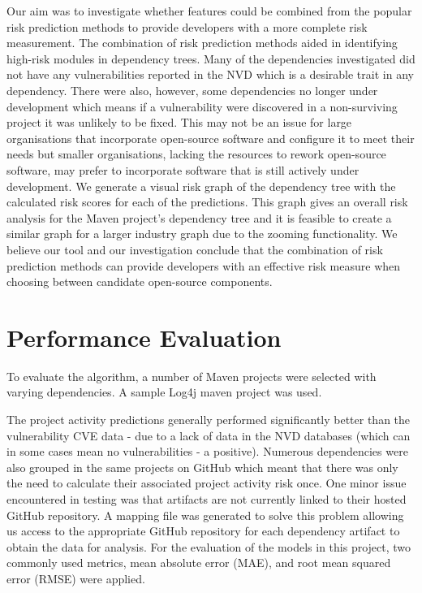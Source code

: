 \documentclass[conference]{IEEEtran}
\begin{document}
Our aim was to investigate whether features could be combined from the popular risk prediction methods to provide developers with a more complete risk measurement. The combination of risk prediction methods aided in identifying high-risk modules in dependency trees. Many of the dependencies investigated did not have any vulnerabilities reported in the NVD which is a desirable trait in any dependency. There were also, however, some dependencies no longer under development which means if a vulnerability were discovered in a non-surviving project it was unlikely to be fixed. This may not be an issue for large organisations that incorporate open-source software and configure it to meet their needs but smaller organisations, lacking the resources to rework open-source software, may prefer to incorporate software that is still actively under development. We generate a visual risk graph of the dependency tree with the calculated risk scores for each of the predictions. This graph gives an overall risk analysis for the Maven project's dependency tree and it is feasible to create a similar graph for a larger industry graph due to the zooming functionality. We believe our tool and our investigation conclude that the combination of risk prediction methods can provide developers with an effective risk measure when choosing between candidate open-source components. 

\section{Performance Evaluation}
To evaluate the algorithm, a number of Maven projects were selected with varying dependencies. A sample Log4j maven project was used. 

The project activity predictions generally performed significantly better than the vulnerability CVE data - due to a lack of data in the NVD databases (which can in some cases mean no vulnerabilities - a positive). Numerous dependencies were also grouped in the same projects on GitHub which meant that there was only the need to calculate their associated project activity risk once. One minor issue encountered in testing was that artifacts are not currently linked to their hosted GitHub repository. A mapping file was generated to solve this problem allowing us access to the appropriate GitHub repository for each dependency artifact to obtain the data for analysis. 
For the evaluation of the models in this project, two commonly used metrics, mean absolute error (MAE), and root mean squared error (RMSE) were applied. 
\end{document}
